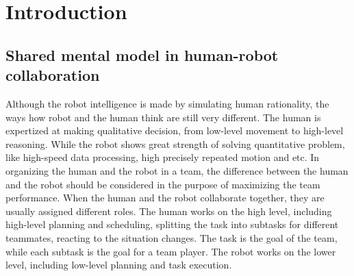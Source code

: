 \documentclass[phd]{byuprop}
\title{\Title}
\author{\Author}
\begin{document}
\maketitle

\section{Introduction}

\subsection{Shared mental model in human-robot collaboration}

Although the robot intelligence is made by simulating human rationality, the ways how robot and the human think are still very different.
The human is expertized at making qualitative decision, from low-level movement to high-level reasoning.
While the robot shows great strength of solving quantitative problem, like high-speed data processing, high precisely repeated motion and etc.
In organizing the human and the robot in a team, the difference between the human and the robot should be considered in the purpose of maximizing the team performance.
When the human and the robot collaborate together, they are usually assigned different roles.
The human works on the high level, including high-level planning and scheduling, splitting the task into subtasks for different teammates, reacting to the situation changes.
The task is the goal of the team, while each subtask is the goal for a team player.  
The robot works on the lower level, including low-level planning and task execution.
\end{document}
